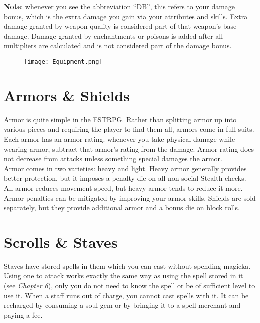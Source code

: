 \begin{tcolorbox}
	\textbf{Note}: whenever you see the abbreviation ``DB'', this refers to your damage bonus, which is the extra damage you gain via your attributes and skills. Extra damage granted by weapon quality is considered part of that weapon's base damage. Damage granted by enchantments or poisons is added after all multipliers are calculated and is not considered part of the damage bonus.
\end{tcolorbox}

\begin{figure}[h]
	\texttt{[image: Equipment.png]}
\end{figure}



\section{Armors \& Shields}

Armor is quite simple in the ESTRPG. Rather than splitting armor up into various pieces and requiring the player to find them all, armors come in full suits. Each armor has an armor rating. whenever you take physical damage while wearing armor, subtract that armor's rating from the damage. Armor rating does not decrease from attacks unless something special damages the armor.\\

Armor comes in two varieties: heavy and light. Heavy armor generally provides better protection, but it imposes a penalty die on all non-social Stealth checks. All armor reduces movement speed, but heavy armor tends to reduce it more. Armor penalties can be mitigated by improving your armor skills. Shields are sold separately, but they provide additional armor and a bonus die on block rolls.

\section{Scrolls \& Staves}

Staves have stored spells in them which you can cast without spending magicka. Using one to attack works exactly the same way as using the spell stored in it (see \textit{Chapter 6}), only you do not need to know the spell or be of sufficient level to use it. When a staff runs out of charge, you cannot cast spells with it. It can be recharged by consuming a soul gem or by bringing it to a spell merchant and paying a fee.\\

